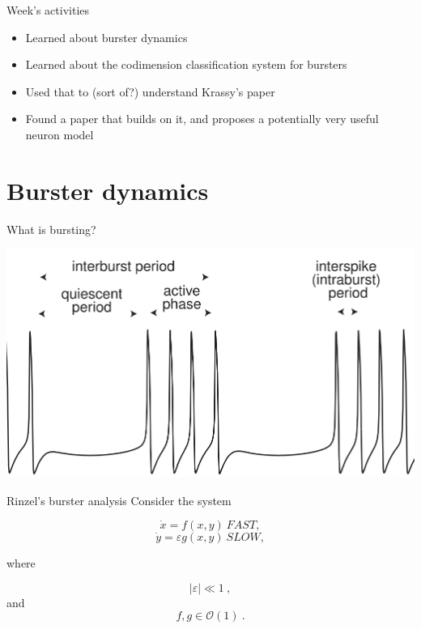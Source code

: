 \documentclass{beamer}
\begin{document}
\begin{frame}[label={sec:org3f8e334}]{Week's activities}
\begin{itemize}
\item Learned about burster dynamics
\item Learned about the codimension classification system for bursters
\item Used that to (sort of?) understand Krassy's paper
\item Found a paper that builds on it, and proposes a potentially very useful neuron model
\end{itemize}
\end{frame}


\section{Burster dynamics}
\label{sec:orgf87a9ca}
\begin{frame}[label={sec:org9817904}]{What is bursting?}
\begin{center}
\includegraphics[height=.85\textheight]{./burster.png}
\end{center}
\end{frame}

\begin{frame}[label={sec:org8d21ea4}]{Rinzel's burster analysis}
Consider the system

\[ \dot{x} = f(x,y) ~FAST,\]
\[ \dot{y} = \varepsilon g(x,y)~SLOW,\]

where 

\[ |\varepsilon| \ll 1~,\] and \[f,g \in \mathcal{O}(1)~.\]
\end{frame}
\end{document}
